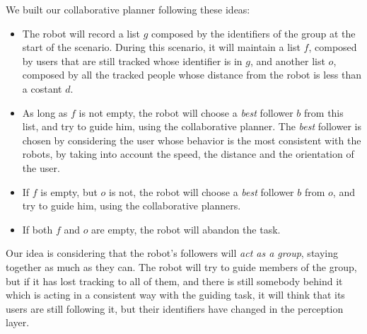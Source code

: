 We built our collaborative planner following these ideas:
\begin{itemize}
\item The robot will record a list $g$ composed by the identifiers of the group at the start of the scenario. During this scenario, it will maintain a list $f$, composed by users that are still tracked whose identifier is in $g$, and another list $o$, composed by all the tracked people whose distance from the robot is less than a costant $d$. 
\item As long as $f$ is not empty, the robot will choose a \textit{best} follower $b$ from this list, and try to guide him, using the collaborative planner. The \textit{best} follower is chosen by considering the user whose behavior is the most consistent with the robots, by taking into account the speed, the distance and the orientation of the user.
\item If $f$ is empty, but $o$ is not, the robot will choose a \textit{best} follower $b$ from $o$, and try to guide him, using the collaborative planners.
\item If  both $f$ and $o$ are empty, the robot will abandon the task.
\end{itemize}

Our idea is considering that the robot's followers will \textit{act as a group}, staying together as much as they can. The robot will try to guide members of the group, but if it has lost tracking to all of them, and there is still somebody behind it which is acting in a consistent way with the guiding task, it will think that its users are still following it, but their identifiers have changed in the perception layer.


